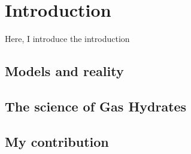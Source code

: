\chapter{Introduction}
Here, I introduce the introduction
\section{Models and reality}
\section{The science of Gas Hydrates}
\section{My contribution}

